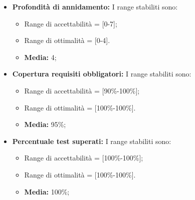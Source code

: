 \begin{itemize}
		\item \textbf{Profondità di annidamento: }I range stabiliti sono:
      \begin{itemize}
        \item Range di accettabilità = [0-7];
        \item Range di ottimalità = [0-4].
        \item \textbf{Media: }4;
      \end{itemize}      
      
      
      \item \textbf{Copertura requisiti obbligatori: }I range stabiliti sono:
      \begin{itemize}
        \item Range di accettabilità = [90\%-100\%];
        \item Range di ottimalità = [100\%-100\%].
        \item \textbf{Media: }95\%;
      \end{itemize}
      
\item \textbf{Percentuale test superati: }I range stabiliti sono:
      \begin{itemize}
        \item Range di accettabilità = [100\%-100\%];
        \item Range di ottimalità = [100\%-100\%].
        \item \textbf{Media: }100\%;
      \end{itemize}

\end{itemize}